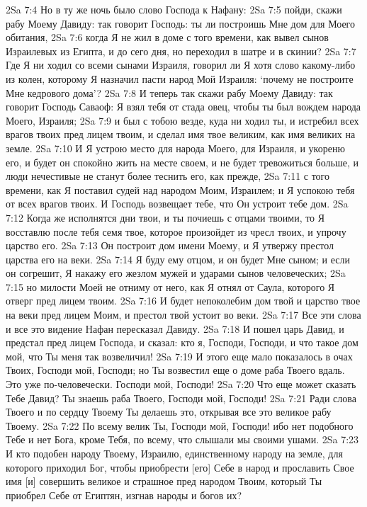 2Sa 7:4  Но в ту же ночь было слово Господа к Нафану:
2Sa 7:5  пойди, скажи рабу Моему Давиду: так говорит Господь: ты ли построишь Мне дом для Моего обитания,
2Sa 7:6  когда Я не жил в доме с того времени, как вывел сынов Израилевых из Египта, и до сего дня, но переходил в шатре и в скинии?
2Sa 7:7  Где Я ни ходил со всеми сынами Израиля, говорил ли Я хотя слово какому-либо из колен, которому Я назначил пасти народ Мой Израиля: `почему не построите Мне кедрового дома'?
2Sa 7:8  И теперь так скажи рабу Моему Давиду: так говорит Господь Саваоф: Я взял тебя от стада овец, чтобы ты был вождем народа Моего, Израиля;
2Sa 7:9  и был с тобою везде, куда ни ходил ты, и истребил всех врагов твоих пред лицем твоим, и сделал имя твое великим, как имя великих на земле.
2Sa 7:10  И Я устрою место для народа Моего, для Израиля, и укореню его, и будет он спокойно жить на месте своем, и не будет тревожиться больше, и люди нечестивые не станут более теснить его, как прежде,
2Sa 7:11  с того времени, как Я поставил судей над народом Моим, Израилем; и Я успокою тебя от всех врагов твоих. И Господь возвещает тебе, что Он устроит тебе дом.
2Sa 7:12  Когда же исполнятся дни твои, и ты почиешь с отцами твоими, то Я восставлю после тебя семя твое, которое произойдет из чресл твоих, и упрочу царство его.
2Sa 7:13  Он построит дом имени Моему, и Я утвержу престол царства его на веки.
2Sa 7:14  Я буду ему отцом, и он будет Мне сыном; и если он согрешит, Я накажу его жезлом мужей и ударами сынов человеческих;
2Sa 7:15  но милости Моей не отниму от него, как Я отнял от Саула, которого Я отверг пред лицем твоим.
2Sa 7:16  И будет непоколебим дом твой и царство твое на веки пред лицем Моим, и престол твой устоит во веки.
2Sa 7:17  Все эти слова и все это видение Нафан пересказал Давиду.
2Sa 7:18  И пошел царь Давид, и предстал пред лицем Господа, и сказал: кто я, Господи, Господи, и что такое дом мой, что Ты меня так возвеличил!
2Sa 7:19  И этого еще мало показалось в очах Твоих, Господи мой, Господи; но Ты возвестил еще о доме раба Твоего вдаль. Это уже по-человечески. Господи мой, Господи!
2Sa 7:20  Что еще может сказать Тебе Давид? Ты знаешь раба Твоего, Господи мой, Господи!
2Sa 7:21  Ради слова Твоего и по сердцу Твоему Ты делаешь это, открывая все это великое рабу Твоему.
2Sa 7:22  По всему велик Ты, Господи мой, Господи! ибо нет подобного Тебе и нет Бога, кроме Тебя, по всему, что слышали мы своими ушами.
2Sa 7:23  И кто подобен народу Твоему, Израилю, единственному народу на земле, для которого приходил Бог, чтобы приобрести [его] Себе в народ и прославить Свое имя [и] совершить великое и страшное пред народом Твоим, который Ты приобрел Себе от Египтян, изгнав народы и богов их?
